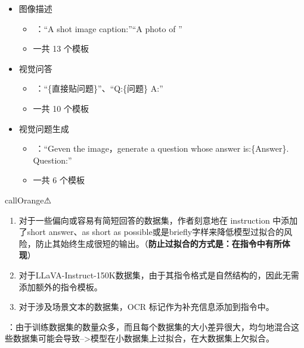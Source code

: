 \documentclass[zihao=false,fontset=windows]{ctexart}
\newcommand{\feiEmoji}[1]{{\emojifont #1}}
\newcommand{\incode}[1]{\colorbox{inlinebg}{\ttfamily\small #1}}
\begin{document}
\begin{itemize}
\item 图像描述\par
\begin{itemize}
\item \feiEmoji{🌰}：“A shot image caption:”“A photo of ”

\item 一共 13 个模板

\end{itemize}
\item 视觉问答\par
\begin{itemize}
\item \feiEmoji{🌰}：“\{直接贴问题\}”、“Q:\{问题\} A:”

\item 一共 10 个模板

\end{itemize}
\item 视觉问题生成\par
\begin{itemize}
\item \feiEmoji{🌰}：“Geven the image，generate a question whose answer is:\{Answer\}. Question:”

\item 一共 6 个模板

\end{itemize}
\end{itemize}

\begin{feishubox}{callOrange}{⚠}
\begin{enumerate}
\item[\textcolor{feishuBlue}{1.}] 对于一些偏向或容易有简短回答的数据集，作者刻意地在 instruction 中添加了\textcolor{feishuBlue}{\incode{short answer}}\textcolor{feishuBlue}{、}\textcolor{feishuBlue}{\incode{as short as possible}}或是\textcolor{feishuBlue}{\incode{briefly}}字样来降低模型过拟合的风险，防止其始终生成很短的输出。（\textcolor{feishuRed}{\textbf{防止过拟合的方式是：在指令中有所体现}}）

\item[\textcolor{feishuBlue}{2.}] 对于LLaVA-Instruct-150K数据集，由于其指令格式是自然结构的，因此无需添加额外的指令模板。

\item[\textcolor{feishuBlue}{3.}] 对于涉及场景文本的数据集，OCR 标记作为补充信息添加到指令中。

\end{enumerate}
\end{feishubox}
\par\vspace{0.75em}\par\vspace{0.28em}
\feiEmoji{🙋}：由于训练数据集的数量众多，而且每个数据集的大小差异很大，均匀地混合这些数据集可能会导致-->\textcolor{feishuBlue}{模型在小数据集上过拟合，在大数据集上欠拟合}。\par
\end{document}
